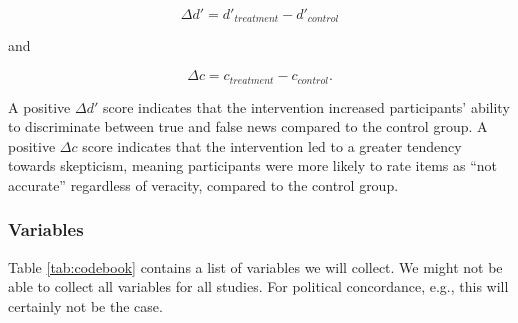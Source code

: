 \documentclass[
  man,mask,floatsintext]{apa6}
\begin{document}
\[
\Delta d' = d'_{treatment} - d'_{control}
\]

and

\[
\Delta c = c_{treatment} - c_{control}.
\]

A positive \(\Delta d'\) score indicates that the intervention increased participants' ability to discriminate between true and false news compared to the control group. A positive \(\Delta c\) score indicates that the intervention led to a greater tendency towards skepticism, meaning participants were more likely to rate items as ``not accurate'' regardless of veracity, compared to the control group.

\subsubsection{Variables}\label{variables}

Table \ref{tab:codebook} contains a list of variables we will collect. We might not be able to collect all variables for all studies. For political concordance, e.g., this will certainly not be the case.

\begingroup\fontsize{10}{12}\selectfont
\end{document}
